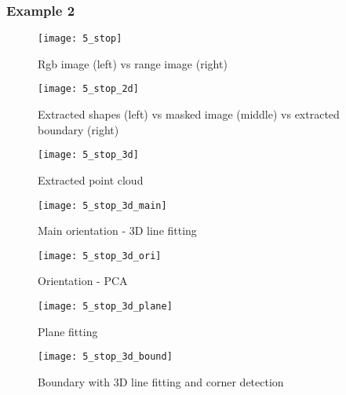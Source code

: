 \newpage

\subsubsection{Example 2}

\begin{figure}[h]
\centering
\texttt{[image: 5\_stop]}
\caption{Rgb image (left) vs range image (right)}
\end{figure}
\begin{figure}[h]
\centering
\texttt{[image: 5\_stop\_2d]}
\caption{Extracted shapes (left) vs masked image (middle) vs extracted boundary (right)}
\end{figure}
\begin{figure}[H]
\centering
\texttt{[image: 5\_stop\_3d]}
\caption{Extracted point cloud}
\end{figure}

\newpage

\begin{figure}[H]
\centering
\texttt{[image: 5\_stop\_3d\_main]}
\caption{Main orientation - 3D line fitting}
\end{figure}
\begin{figure}[H]
\centering
\texttt{[image: 5\_stop\_3d\_ori]}
\caption{Orientation - PCA}
\end{figure}

\newpage

\begin{figure}[H]
\centering
\texttt{[image: 5\_stop\_3d\_plane]}
\caption{Plane fitting}
\end{figure}
\begin{figure}[H]
\centering
\texttt{[image: 5\_stop\_3d\_bound]}
\caption{Boundary with 3D line fitting and corner detection}
\end{figure}

